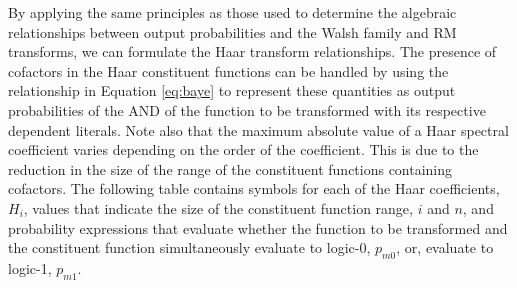 By applying the same principles as those used to determine the algebraic relationships
between output probabilities and the Walsh family and RM transforms, we can formulate the
Haar transform relationships.  The presence of cofactors in the Haar constituent functions
can be handled by using the relationship in Equation \ref{eq:baye} to represent these quantities
as output probabilities of the AND of the function to be transformed with its respective
dependent literals.  Note also that the maximum absolute value of a Haar spectral coefficient
varies depending on the order of the coefficient.  This is due to the reduction in 
the size of the range of the constituent functions containing cofactors.  The following table
contains symbols for each of the Haar coefficients, $H_i$, values that indicate the size of the
constituent function range, $i$ and $n$, and probability expressions that evaluate whether the
function to be transformed and the constituent function simultaneously evaluate to
logic-0, $p_{m0}$, or, evaluate to logic-1, $p_{m1}$.

